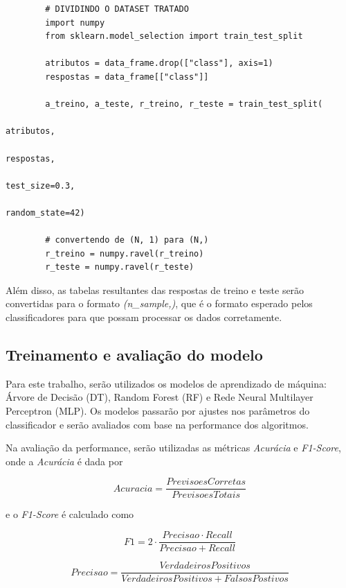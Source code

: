 \documentclass[12pt,a4paper]{article}
\begin{document}
\begin{mdframed}[userdefinedwidth=\linewidth]
	\begin{verbatim}
		# DIVIDINDO O DATASET TRATADO
		import numpy
		from sklearn.model_selection import train_test_split

		atributos = data_frame.drop(["class"], axis=1)
		respostas = data_frame[["class"]]

		a_treino, a_teste, r_treino, r_teste = train_test_split(
																																									atributos, 
																																									respostas, 
																																									test_size=0.3, 
																																									random_state=42)

		# convertendo de (N, 1) para (N,)
		r_treino = numpy.ravel(r_treino)
		r_teste = numpy.ravel(r_teste)
		\end{verbatim}
\end{mdframed}

\vspace{0.15cm}
\quad\space Além disso, as tabelas resultantes das respostas de treino e teste serão convertidas para o formato \textit{(n\_sample,)}, que é o formato esperado pelos classificadores para que possam processar os dados corretamente.

\subsection{Treinamento e avaliação do modelo}

\quad\space Para este trabalho, serão utilizados os modelos de aprendizado de máquina: Árvore de Decisão (DT), Random Forest (RF) e Rede Neural Multilayer Perceptron (MLP). Os modelos passarão por ajustes nos parâmetros do classificador e serão avaliados com base na performance dos algoritmos.

Na avaliação da performance, serão utilizadas as métricas \textit{Acurácia} e \textit{F1-Score}, onde a \textit{Acurácia} é dada por

\begin{equation*}
	Acuracia = \frac{PrevisoesCorretas}{PrevisoesTotais} 
\end{equation*}

\noindent
 e o \textit{F1-Score} é calculado como
 
\begin{equation*}
F1 = 2 \cdot \frac{Precisao \cdot Recall}{Precisao + Recall}
\end{equation*}

\begin{equation*}
Precisao = \frac{VerdadeirosPositivos}{VerdadeirosPositivos + FalsosPostivos} 
\end{equation*}
\end{document}
